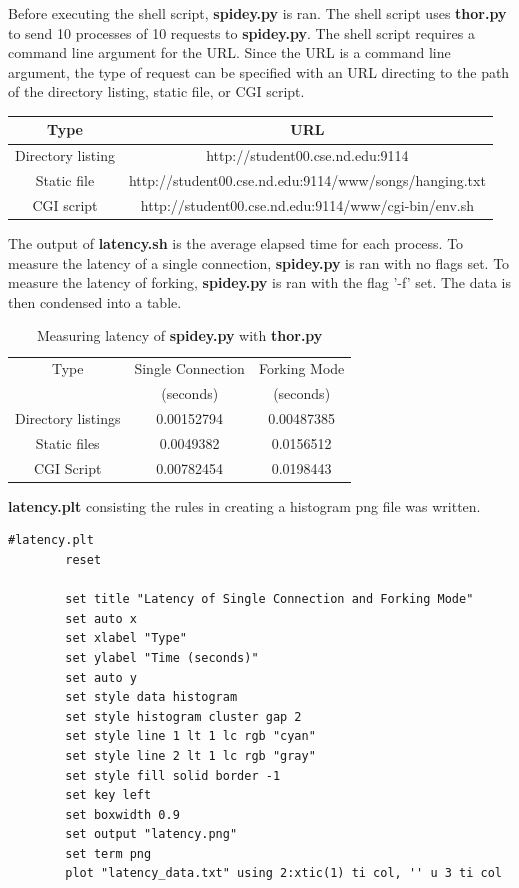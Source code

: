 \documentclass{article}
\begin{document}
\noindent Before executing the shell script, \textbf{spidey.py} is ran. The shell script uses \textbf{thor.py} to send 10 processes of 10 requests to \textbf{spidey.py}. The shell script requires a command line argument for the URL. Since the URL is a command line argument, the type of request can be specified with an URL directing to the path of the directory listing, static file, or CGI script.

\begin{table}[H]
    \centering
    \begin{tabular}{|c|c|}
        \hline
        Type & URL\\
        \hline
        Directory listing & http://student00.cse.nd.edu:9114\\
        Static file & http://student00.cse.nd.edu:9114/www/songs/hanging.txt\\
        CGI script & http://student00.cse.nd.edu:9114/www/cgi-bin/env.sh\\
        \hline
    \end{tabular}
\end{table} 

\noindent The output of \textbf{latency.sh} is the average elapsed time for each process. To measure the latency of a single connection, \textbf{spidey.py} is ran with no flags set. To measure the latency of forking, \textbf{spidey.py} is ran with the flag '-f' set. The data is then condensed into a table. 

\begin{table}[H]
    \centering
    \begin{tabular}{|c||c|c|}
        \hline
        Type & Single Connection  & Forking Mode  \\
        & (seconds) & (seconds) \\
        \hline
        \hline
         Directory listings & 0.00152794 & 0.00487385 \\
         Static files & 0.0049382 & 0.0156512 \\
         CGI Script & 0.00782454 & 0.0198443 \\
         \hline
    \end{tabular}
    \caption{Measuring latency of \textbf{spidey.py} with \textbf{thor.py}}
    \label{tab:my_label}
\end{table}

\noindent \textbf{latency.plt} consisting the rules in creating a histogram png file was written.

\begin{Verbatim}[fontsize=\footnotesize]
        #latency.plt
        reset
        
        set title "Latency of Single Connection and Forking Mode"
        set auto x
        set xlabel "Type"
        set ylabel "Time (seconds)"
        set auto y
        set style data histogram
        set style histogram cluster gap 2
        set style line 1 lt 1 lc rgb "cyan"
        set style line 2 lt 1 lc rgb "gray"
        set style fill solid border -1
        set key left
        set boxwidth 0.9
        set output "latency.png"
        set term png
        plot "latency_data.txt" using 2:xtic(1) ti col, '' u 3 ti col
\end{Verbatim}
\end{document}
